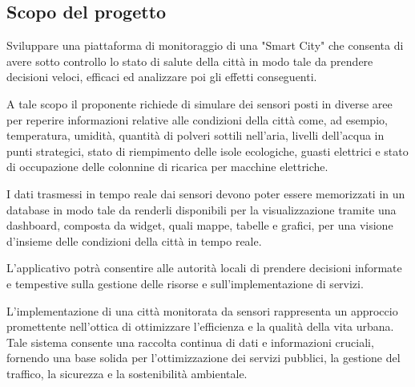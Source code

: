 \subsection{Scopo del progetto}
Sviluppare una piattaforma di monitoraggio di una "Smart City" che consenta di avere sotto controllo lo stato di salute della città in modo tale da prendere decisioni veloci, efficaci ed analizzare poi gli effetti conseguenti.

A tale scopo il proponente richiede di simulare dei sensori posti in diverse aree per reperire informazioni relative alle condizioni della città come, ad esempio, temperatura, umidità, quantità di polveri sottili nell’aria, livelli dell'acqua in punti strategici, stato di riempimento delle isole ecologiche, guasti elettrici e stato di occupazione delle colonnine di ricarica per macchine elettriche.

I dati trasmessi in tempo reale dai sensori devono poter essere memorizzati in un database in modo tale da renderli disponibili per la visualizzazione tramite una dashboard, composta da widget, quali mappe, tabelle e grafici, per una visione d’insieme delle condizioni della città in tempo reale.

L’applicativo potrà consentire alle autorità locali di prendere decisioni informate e tempestive sulla gestione delle risorse e sull’implementazione di servizi.

L’implementazione di una città monitorata da sensori rappresenta un approccio promettente nell’ottica di ottimizzare l’efficienza e la qualità della vita urbana. Tale sistema consente una raccolta continua di dati e informazioni cruciali, fornendo una base solida per l’ottimizzazione
dei servizi pubblici, la gestione del traffico, la sicurezza e la sostenibilità ambientale.
